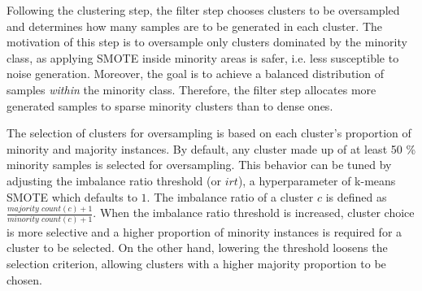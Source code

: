 \documentclass[sort&compress]{elsarticle}
\begin{document}
	Following the clustering step, the filter step chooses clusters to be
	oversampled and determines how many samples are to be generated in each
	cluster. The motivation of this step is to oversample only clusters
	dominated by the minority class, as applying \ac{SMOTE} inside minority
	areas is safer, i.e. less susceptible to noise generation. Moreover, the
	goal is to achieve a balanced distribution of samples \textit{within} the
	minority class. Therefore, the filter step allocates more generated samples
	to sparse minority clusters than to dense ones.
	
	The selection of clusters for oversampling is based on each cluster's
	proportion of minority and majority instances. By default, any cluster made
	up of at least 50 \% minority samples is selected for oversampling. This
	behavior can be tuned by adjusting the imbalance ratio threshold (or $irt$),
	a hyperparameter of k-means \ac{SMOTE} which defaults to $1$. The imbalance
	ratio of a cluster $c$ is defined as $\frac{\textit{majority count}(c) +
	1}{\textit{minority count}(c) + 1}$. When the imbalance ratio threshold is
	increased, cluster choice is more selective and a higher proportion of
	minority instances is required for a cluster to be selected. On the other
	hand, lowering the threshold loosens the selection criterion, allowing
	clusters with a higher majority proportion to be chosen.
\end{document}
